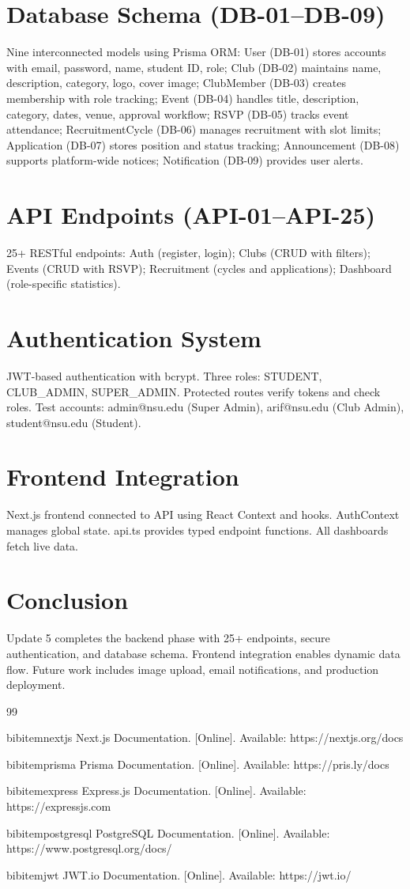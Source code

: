 \documentclass[conference]{IEEEtran}
\begin{document}
\section{Database Schema (DB-01--DB-09)}
Nine interconnected models using Prisma ORM: User (DB-01) stores accounts with email, password, name, student ID, role; Club (DB-02) maintains name, description, category, logo, cover image; ClubMember (DB-03) creates membership with role tracking; Event (DB-04) handles title, description, category, dates, venue, approval workflow; RSVP (DB-05) tracks event attendance; RecruitmentCycle (DB-06) manages recruitment with slot limits; Application (DB-07) stores position and status tracking; Announcement (DB-08) supports platform-wide notices; Notification (DB-09) provides user alerts.

\section{API Endpoints (API-01--API-25)}
25+ RESTful endpoints: Auth (register, login); Clubs (CRUD with filters); Events (CRUD with RSVP); Recruitment (cycles and applications); Dashboard (role-specific statistics).

\section{Authentication System}
JWT-based authentication with bcrypt. Three roles: STUDENT, CLUB\_ADMIN, SUPER\_ADMIN. Protected routes verify tokens and check roles. Test accounts: admin@nsu.edu (Super Admin), arif@nsu.edu (Club Admin), student@nsu.edu (Student).

\section{Frontend Integration}
Next.js frontend connected to API using React Context and hooks. AuthContext manages global state. api.ts provides typed endpoint functions. All dashboards fetch live data.

\section{Conclusion}
Update 5 completes the backend phase with 25+ endpoints, secure authentication, and database schema. Frontend integration enables dynamic data flow. Future work includes image upload, email notifications, and production deployment.

\begin{thebibliography}{99}
\addtocounter{enumiv}{1}

bibitem{nextjs} Next.js Documentation. [Online]. Available: https://nextjs.org/docs

bibitem{prisma} Prisma Documentation. [Online]. Available: https://pris.ly/docs

bibitem{express} Express.js Documentation. [Online]. Available: https://expressjs.com

bibitem{postgresql} PostgreSQL Documentation. [Online]. Available: https://www.postgresql.org/docs/

bibitem{jwt} JWT.io Documentation. [Online]. Available: https://jwt.io/

\end{thebibliography}
\end{document}
